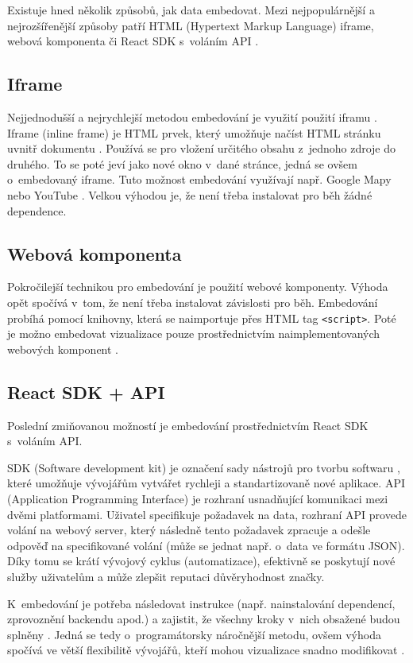 \documentclass[czech, bc, kiv, he, iso690numb]{fasthesis}
\begin{document}
Existuje hned několik způsobů, jak data embedovat. Mezi nejpopulárnější a nejrozšířenější způsoby patří HTML (Hypertext Markup Language) iframe, webová komponenta či React SDK s~voláním API \cite{goodDataEmbedded}. 

\subsection{Iframe}
Nejjednodušší a nejrychlejší metodou embedování je využití použití iframu \cite{goodDataEmbedded}. Iframe (inline frame) je HTML prvek, který umožňuje načíst HTML stránku uvnitř dokumentu \cite{iFrameAdv}. Používá se pro vložení určitého obsahu z~jednoho zdroje do druhého. To se poté jeví jako nové okno v~dané stránce, jedná se ovšem o~embedovaný iframe. Tuto možnost embedování využívají např. Google Mapy nebo YouTube \cite{iFrameAdv}. Velkou výhodou je, že není třeba instalovat pro běh žádné dependence.

\subsection{Webová komponenta}
Pokročilejší technikou pro embedování je použití webové komponenty. Výhoda opět spočívá v~tom, že není třeba instalovat závislosti pro běh. Embedování probíhá pomocí knihovny, která se naimportuje přes HTML tag \texttt{<script>}. Poté je možno embedovat vizualizace pouze prostřednictvím naimplementovaných webových komponent \cite{webComp}.

\subsection{React SDK + API}
Poslední zmiňovanou možností je embedování prostřednictvím React SDK s~voláním API. 

SDK (Software development kit) je označení sady nástrojů pro tvorbu softwaru \cite{SDKvsAPI}, které umožňuje vývojářům vytvářet rychleji a standartizovaně nové aplikace. API 
(Application Programming Interface) je rozhraní usnadňující komunikaci mezi dvěmi platformami. Uživatel specifikuje požadavek na data, rozhraní API provede volání na webový server, který
následně tento požadavek zpracuje a odešle odpověď na specifikované volání (může se jednat např. o~data ve formátu JSON). Díky tomu se krátí vývojový cyklus (automatizace), efektivně 
se poskytují nové služby uživatelům a může zlepšit reputaci důvěryhodnost značky.

K~embedování je potřeba následovat instrukce (např. nainstalování dependencí, zprovoznění backendu apod.) a zajistit, že všechny kroky v~nich obsažené budou splněny \cite{reactSDKComp}. Jedná se tedy o~programátorsky náročnější metodu, ovšem výhoda spočívá ve větší flexibilitě vývojářů, kteří mohou vizualizace snadno modifikovat \cite{goodDataEmbedded}.
\end{document}
